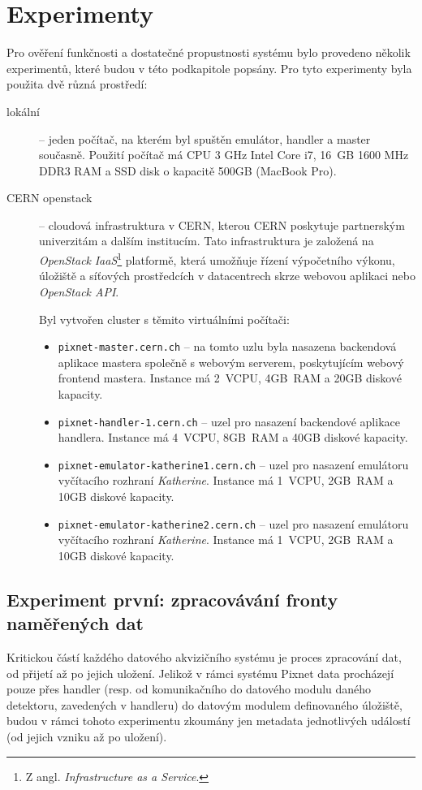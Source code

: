 \section{Experimenty}
Pro ověření funkčnosti a dostatečné propustnosti systému bylo provedeno několik experimentů, které budou v této podkapitole popsány. Pro tyto experimenty byla použita dvě různá prostředí:
\begin{description}
    \item[lokální] -- jeden počítač, na kterém byl spuštěn emulátor, handler a master současně. Použití počítač má CPU 3 GHz Intel Core i7, 16 GB 1600 MHz DDR3 RAM a SSD disk o kapacitě \unit{500}{GB} (MacBook Pro).
    \item[CERN openstack] -- cloudová infrastruktura v CERN, kterou CERN poskytuje partnerským univerzitám a dalším institucím. Tato infrastruktura je založená na \textit{OpenStack} \textit{IaaS}\footnote{Z angl. \textit{Infrastructure as a Service}.} platformě, která umožňuje řízení výpočetního výkonu, úložiště a síťových prostředcích v datacentrech skrze webovou aplikaci nebo \textit{OpenStack API}.

    Byl vytvořen cluster s těmito virtuálními počítači:
    \begin{itemize}
        \item \texttt{pixnet-master.cern.ch} -- na tomto uzlu byla nasazena backendová aplikace mastera společně s webovým serverem, poskytujícím webový frontend mastera. Instance má 2~VCPU, \unit{4}{GB}~RAM a \unit{20}{GB} diskové kapacity.
        \item \texttt{pixnet-handler-1.cern.ch} -- uzel pro nasazení backendové aplikace handlera. Instance má 4~VCPU, \unit{8}{GB}~RAM a \unit{40}{GB} diskové kapacity.
        \item \texttt{pixnet-emulator-katherine1.cern.ch} -- uzel pro nasazení emulátoru vyčítacího rozhraní \textit{Katherine}. Instance má 1~VCPU, \unit{2}{GB}~RAM a \unit{10}{GB} diskové kapacity.
        \item \texttt{pixnet-emulator-katherine2.cern.ch} -- uzel pro nasazení emulátoru vyčítacího rozhraní \textit{Katherine}. Instance má 1~VCPU, \unit{2}{GB}~RAM a \unit{10}{GB} diskové kapacity.
    \end{itemize}

\end{description}

\subsection{Experiment první: zpracovávání fronty naměřených dat}
Kritickou částí každého datového akvizičního systému je proces zpracování dat, od přijetí až po jejich uložení. Jelikož v rámci systému Pixnet data procházejí pouze přes handler (resp. od komunikačního do datového modulu daného detektoru, zavedených v handleru) do datovým modulem definovaného úložiště, budou v rámci tohoto experimentu zkoumány jen metadata jednotlivých událostí (od jejich vzniku až po uložení).

